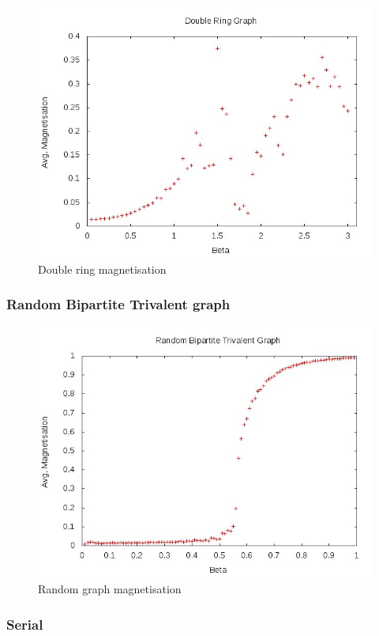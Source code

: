 \documentclass[pdftex,12pt,a4paper]{article}
\begin{document}
\begin{figure}
\centering
\includegraphics[scale=0.8]{double_ring_mag.jpg}
\caption{Double ring magnetisation}
\end{figure}

\subsubsection{Random Bipartite Trivalent graph}

\begin{figure}
\centering
\includegraphics[scale=0.8]{rand_mag.jpg}
\caption{Random graph magnetisation}
\end{figure}

\subsubsection{Serial}
\end{document}
